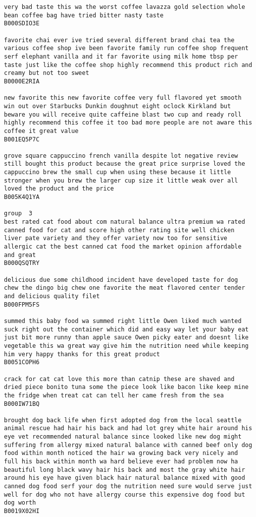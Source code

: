 \documentclass[11pt]{article}
\begin{document}
\begin{Verbatim}[commandchars=\\\{\}]
very bad taste this wa the worst coffee lavazza gold selection whole bean coffee bag have tried bitter nasty taste
B000SDIO3E

favorite chai ever ive tried several different brand chai tea the various coffee shop ive been favorite family run coffee shop frequent serf elephant vanilla and it far favorite using milk home tbsp per taste just like the coffee shop highly recommend this product rich and creamy but not too sweet
B0000E2RIA

new favorite this new favorite coffee very full flavored yet smooth win out over Starbucks Dunkin doughnut eight oclock Kirkland but beware you will receive quite caffeine blast two cup and ready roll highly recommend this coffee it too bad more people are not aware this coffee it great value
B001EQ5P7C

grove square cappuccino french vanilla despite lot negative review still bought this product because the great price surprise loved the cappuccino brew the small cup when using these because it little stronger when you brew the larger cup size it little weak over all loved the product and the price
B005K4Q1YA

group  3
best rated cat food about com natural balance ultra premium wa rated canned food for cat and score high other rating site well chicken liver pate variety and they offer variety now too for sensitive allergic cat the best canned cat food the market opinion affordable and great
B000QSQTRY

delicious due some childhood incident have developed taste for dog chew the dingo big chew one favorite the meat flavored center tender and delicious quality filet
B000FPM5FS

summed this baby food wa summed right little Owen liked much wanted suck right out the container which did and easy way let your baby eat just bit more runny than apple sauce Owen picky eater and doesnt like vegetable this wa great way give him the nutrition need while keeping him very happy thanks for this great product
B0051COPH6

crack for cat cat love this more than catnip these are shaved and dried piece bonito tuna some the piece look like bacon like keep mine the fridge when treat cat can tell her came fresh from the sea
B000IW71BQ

brought dog back life when first adopted dog from the local seattle animal rescue had hair his back and had lot grey white hair around his eye vet recommended natural balance since looked like new dog might suffering from allergy mixed natural balance with canned beef only dog food within month noticed the hair wa growing back very nicely and full his back within month wa hard believe ever had problem now ha beautiful long black wavy hair his back and most the gray white hair around his eye have given black hair natural balance mixed with good canned dog food serf your dog the nutrition need sure would serve just well for dog who not have allergy course this expensive dog food but dog worth
B0019X02HI


\end{Verbatim}
\end{document}
